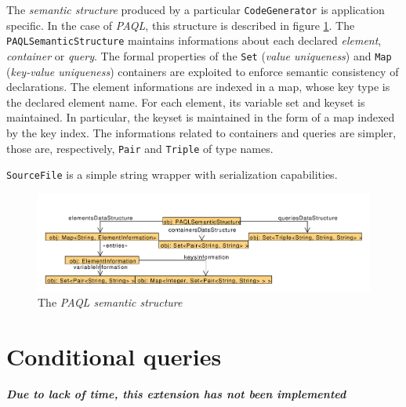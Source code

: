 \documentclass[10pt]{article}  %
\begin{document}
    The \emph{semantic structure} produced by a particular \texttt{CodeGenerator} is application specific. In the case of \emph{PAQL},
    this structure is described in figure \ref{fig:semanticStructure}.
    The \texttt{PAQLSemanticStructure} maintains informations about each declared \emph{element}, \emph{container} or \emph{query}.
    The formal properties of the \texttt{Set} (\emph{value uniqueness}) and \texttt{Map} (\emph{key-value uniqueness}) containers
    are exploited to enforce semantic consistency of declarations.
    The element informations are indexed in a map, whose key type is the declared element name.
    For each element, its variable set and keyset is maintained. In particular, the keyset is maintained in the form of a map indexed by the key index.
    The informations related to containers and queries are simpler, those are, respectively, \texttt{Pair} and \texttt{Triple} of type names.

    \texttt{SourceFile} is a simple string wrapper with serialization capabilities.
    \begin{figure}[htbp]
        \centering
        \includegraphics[scale=0.45]{semanticStructure.pdf}
        \caption{The \emph{PAQL semantic structure}}\label{fig:semanticStructure}
    \end{figure}
\section{Conditional queries}

    \begin{center}
        \textbf{\emph{Due to lack of time, this extension has not been implemented}}
    \end{center}
\end{document}
